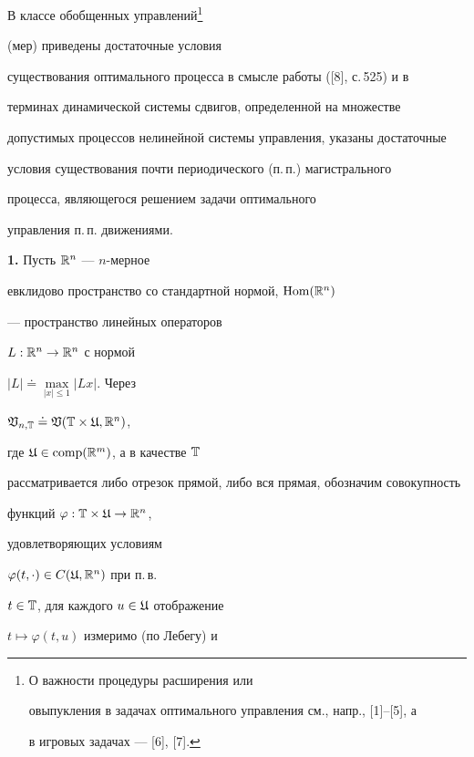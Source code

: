 В классе обобщенных управлений\footnote{О важности процедуры расширения или


овыпукления в задачах оптимального управления см., напр., [1]--[5], а


в игровых задачах --- [6], [7].}


(мер) приведены достаточные условия


существования оптимального процесса в смысле работы ([8], с.\,525) и в


терминах динамической системы сдвигов, определенной на множестве


допустимых процессов нелинейной системы управления, указаны достаточные


условия существования почти периодического (п.\,п.) магистрального


процесса, являющегося решением задачи оптимального


управления п.\,п. движениями.


\medskip


\setcounter{section}{1}


\setcounter{equation}{0}


\setcounter{lems}{0}


\setcounter{defns}{0}


\setcounter{notes}{0}





{\bf 1.} Пусть $\Bbb R^{n}$ --- $n$-мерное


евклидово пространство со стандартной нормой, $\operatorname{Hom}(\Bbb R^n)$


--- пространство линейных операторов


$L:\Bbb R^n\to\Bbb R^n$ с нормой


$|L|\doteq\max\limits_{|x|\le1}|Lx|$. Через


$\frak V_{n,\Bbb T}\doteq 


\frak V(\Bbb T\times\frak U,\Bbb R^n)$,


где $\frak U\in\operatorname{comp}(\Bbb R^m)$, а в качестве $\Bbb T$


рассматривается либо отрезок прямой, либо вся прямая, обозначим совокупность


функций $\varphi:\Bbb T\times\frak U\to\Bbb R^n$,


удовлетворяющих условиям


$\varphi(t,\cdot)\in C(\frak U,\Bbb R^n)$ при п.\,в.


$t\in\Bbb T$, для каждого $u\in\frak U$ отображение


$t\mapsto\varphi(t,u)$ измеримо (по Лебегу) и


